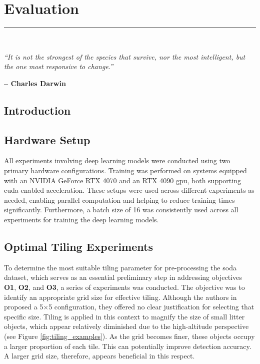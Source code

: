\graphicspath{{content/chapters/5_evaluation/figures/}}

\chapter{Evaluation}%
\label{chp:evaluation}
\rule{\textwidth}{1pt} \\[1ex]

\epigraph{\textit{``It is not the strongest of the species that survive, nor the most intelligent, but the one most responsive to change.''}}{\textbf{-- Charles Darwin}}

\section{Introduction}
\label{sec:5_introduction}

\section{Hardware Setup}
\label{sec:5_hardware_setup}

All experiments involving deep learning models were conducted using two primary hardware configurations. Training was performed on systems equipped with an NVIDIA GeForce RTX 4070 and an RTX 4090 \gls{gpu}, both supporting \gls{cuda}-enabled acceleration. These setups were used across different experiments as needed, enabling parallel computation and helping to reduce training times significantly. Furthermore, a batch size of 16 was consistently used across all experiments for training the deep learning models.


\section{Optimal Tiling Experiments}
\label{sec:5_tiling_exp}

To determine the most suitable tiling parameter for pre-processing the \gls{soda} dataset, which serves as an essential preliminary step in addressing objectives \textbf{O1}, \textbf{O2}, and \textbf{O3}, a series of experiments was conducted. The objective was to identify an appropriate grid size for effective tiling. Although the authors in \cite{detect_litter} proposed a 5$\times$5 configuration, they offered no clear justification for selecting that specific size.
Tiling is applied in this context to magnify the size of small litter objects, which appear relatively diminished due to the high-altitude perspective (see Figure \ref{fig:tiling_examples}). As the grid becomes finer, these objects occupy a larger proportion of each tile. This can potentially improve detection accuracy. A larger grid size, therefore, appears beneficial in this respect.

